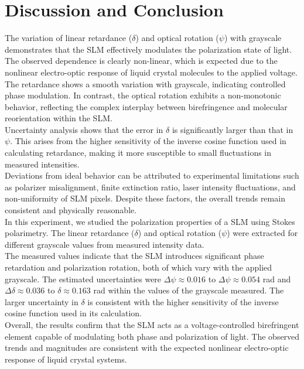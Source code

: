 \documentclass[usenames, svgnames, dvipsnames]{scrartcl}
\begin{document}
\section{Discussion and Conclusion}
The variation of linear retardance ($\delta$) and optical rotation ($\psi$) with grayscale demonstrates that the SLM effectively modulates the polarization state of light. The observed dependence is clearly non-linear, which is expected due to the nonlinear electro-optic response of liquid crystal molecules to the applied voltage.\\[0.2cm]
The retardance shows a smooth variation with grayscale, indicating controlled phase modulation. In contrast, the optical rotation exhibits a non-monotonic behavior, reflecting the complex interplay between birefringence and molecular reorientation within the SLM.\\[0.2cm]
Uncertainty analysis shows that the error in $\delta$ is significantly larger than that in $\psi$. This arises from the higher sensitivity of the inverse cosine function used in calculating retardance, making it more susceptible to small fluctuations in measured intensities.\\[0.2cm]
Deviations from ideal behavior can be attributed to experimental limitations such as polarizer misalignment, finite extinction ratio, laser intensity fluctuations, and non-uniformity of SLM pixels. Despite these factors, the overall trends remain consistent and physically reasonable.\\[0.2cm]
In this experiment, we studied the polarization properties of a SLM using Stokes polarimetry. The linear retardance ($\delta$) and optical rotation ($\psi$) were extracted for different grayscale values from measured intensity data.\\[0.2cm]
The measured values indicate that the SLM introduces significant phase retardation and polarization rotation, both of which vary with the applied grayscale. The estimated uncertainties were $\Delta \psi \approx 0.016$ to $\Delta \psi \approx 0.054$ rad and $\Delta \delta \approx 0.036$ to $\delta \approx 0.163$ rad within the values of the grayscale measured. The larger uncertainty in $\delta$ is consistent with the higher sensitivity of the inverse cosine function used in its calculation.\\[0.2cm]
Overall, the results confirm that the SLM acts as a voltage-controlled birefringent element capable of modulating both phase and polarization of light. The observed trends and magnitudes are consistent with the expected nonlinear electro-optic response of liquid crystal systems.\\[0.2cm]
\end{document}
